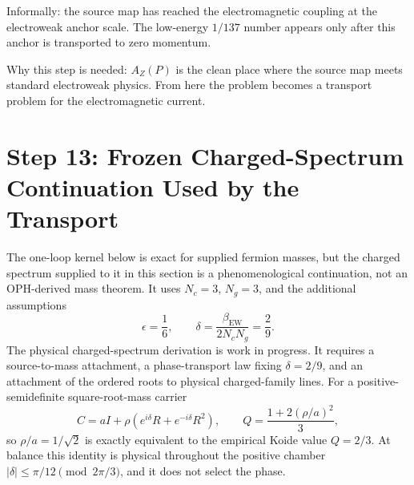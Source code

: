 \documentclass[11pt]{article}
\theoremstyle{remark}
\newcommand{\AZ}{A_Z}
\newcommand{\Nc}{N_c}
\newcommand{\Ng}{N_g}
\begin{document}
Informally: the source map has reached the electromagnetic coupling at the electroweak anchor scale. The low-energy \(1/137\) number appears only after this anchor is transported to zero momentum.

Why this step is needed: \(\AZ(P)\) is the clean place where the source map meets standard electroweak physics. From here the problem becomes a transport problem for the electromagnetic current.

\section{Step 13: Frozen Charged-Spectrum Continuation Used by the Transport}

The one-loop kernel below is exact for supplied fermion masses, but the charged
spectrum supplied to it in this section is a phenomenological continuation,
not an OPH-derived mass theorem.  It uses \(\Nc=3\), \(\Ng=3\), and the
additional assumptions
\begin{equation}
\epsilon=\frac16,
\qquad
\delta=\frac{\beta_{\mathrm{EW}}}{2\Nc\Ng}
=\frac{2}{9}.
\label{eq:epsdelta}
\end{equation}
The physical charged-spectrum derivation is work in progress. It requires
a source-to-mass attachment, a phase-transport law fixing \(\delta=2/9\),
and an attachment of the ordered roots to physical charged-family lines. For a
positive-semidefinite square-root-mass carrier
\[
C=aI+\rho(e^{i\delta}R+e^{-i\delta}R^2),
\qquad
Q=\frac{1+2(\rho/a)^2}{3},
\]
so \(\rho/a=1/\sqrt2\) is exactly equivalent to the empirical Koide value
\(Q=2/3\). At balance this identity is physical throughout the positive
chamber \(|\delta|\leq\pi/12\pmod{2\pi/3}\), and it does not select the phase.
\end{document}
